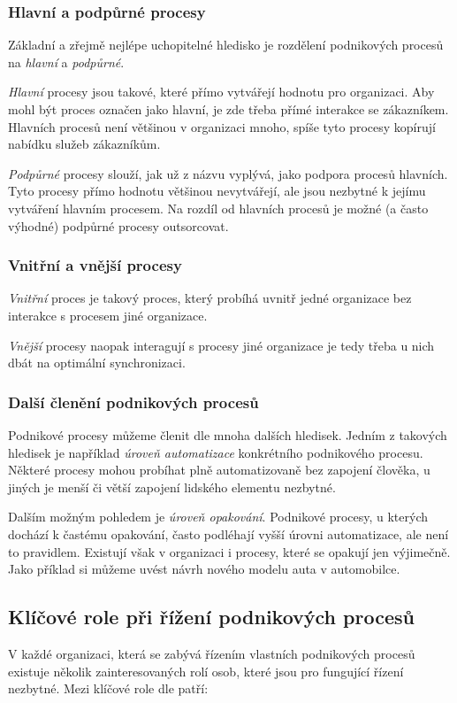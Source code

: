 \documentclass[]{article}
\begin{document}
\subsubsection{Hlavní a podpůrné procesy}
Základní a zřejmě nejlépe uchopitelné hledisko je rozdělení podnikových procesů na \textit{hlavní} a \textit{podpůrné}.

\textit{Hlavní} procesy jsou takové, které přímo vytvářejí hodnotu pro organizaci. Aby mohl být proces označen jako hlavní, je zde třeba přímé interakce se zákazníkem. Hlavních procesů není většinou v organizaci mnoho, spíše tyto procesy kopírují nabídku služeb zákazníkům.

\textit{Podpůrné} procesy slouží, jak už z názvu vyplývá, jako podpora procesů hlavních. Tyto procesy přímo hodnotu většinou nevytvářejí, ale jsou nezbytné k jejímu vytváření hlavním procesem. Na rozdíl od hlavních procesů je možné (a často výhodné) podpůrné procesy outsorcovat.

\subsubsection{Vnitřní a vnější procesy}
\textit{Vnitřní} proces je takový proces, který probíhá uvnitř jedné organizace bez interakce s procesem jiné organizace.

\textit{Vnější} procesy naopak interagují s procesy jiné organizace je tedy třeba u nich dbát na optimální synchronizaci.

\subsubsection{Další členění podnikových procesů}
Podnikové procesy můžeme členit dle mnoha dalších hledisek. Jedním z takových hledisek je například \textit{úroveň automatizace} konkrétního podnikového procesu. Některé procesy mohou probíhat plně automatizovaně bez zapojení člověka, u jiných je menší či větší zapojení lidského elementu nezbytné.

Dalším možným pohledem je \textit{úroveň opakování}. Podnikové procesy, u kterých dochází k častému opakování, často podléhají vyšší úrovni automatizace, ale není to pravidlem. Existují však v organizaci i procesy, které se opakují jen výjimečně. Jako příklad si můžeme uvést návrh nového modelu auta v automobilce.

\subsection{Klíčové role při řížení podnikových procesů}
V každé organizaci, která se zabývá řízením vlastních podnikových procesů existuje několik zainteresovaných rolí osob, které jsou pro fungující řízení nezbytné. Mezi klíčové role dle \cite{Weske2007} patří: 
\end{document}
